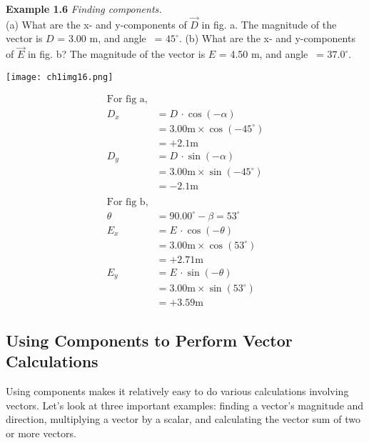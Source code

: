 \begin{examplebox}
\textbf{Example 1.6} \textit{Finding components.}\\

(a) What are the x- and y-components of $\overrightarrow{D}$ in fig. a. The magnitude of the vector is $D$ = 3.00 m, and angle \alpha\, = $45^\circ$. (b) What are the x- and y-components of $\overrightarrow{E}$ in fig. b? The magnitude of the vector is $E$ = 4.50 m, and angle \beta \, = $37.0^\circ$.

\begin{center}
\texttt{[image: ch1img16.png]}
\end{center}
\begin{mathbox}
\begin{align*}
\text{For fig a,}\\
D_x &= D \, \cdot \cos \left(- \alpha\right)\\
&= 3.00 \text{m} \times \cos\left(-45^\circ\right)\\
&= +2.1 \text{m}\\
D_y &= D \, \cdot \sin \left(- \alpha\right)\\
&= 3.00 \text{m} \times \sin\left(-45^\circ \right)\\
&= -2.1 \text{m}\\\\
\text{For fig b,}\\
\theta\, &= 90.00^\circ - \beta = 53^\circ\\ 
E_x &= E \, \cdot \cos \left(- \theta\right)\\
&= 3.00 \text{m} \times \cos\left(53^\circ\right)\\
&= +2.71 \text{m}\\
E_y &= E \, \cdot \sin \left(- \theta\right)\\
&= 3.00 \text{m} \times \sin\left(53^\circ \right)\\
&= +3.59 \text{m}
\end{align*}
\end{mathbox}
\end{examplebox}

\subsection*{Using Components to Perform Vector Calculations}
Using components makes it relatively easy to do various calculations involving vectors. Let’s look at three important examples: finding a vector’s magnitude and direction, multiplying a vector by a scalar, and calculating the vector sum of two or more vectors.

